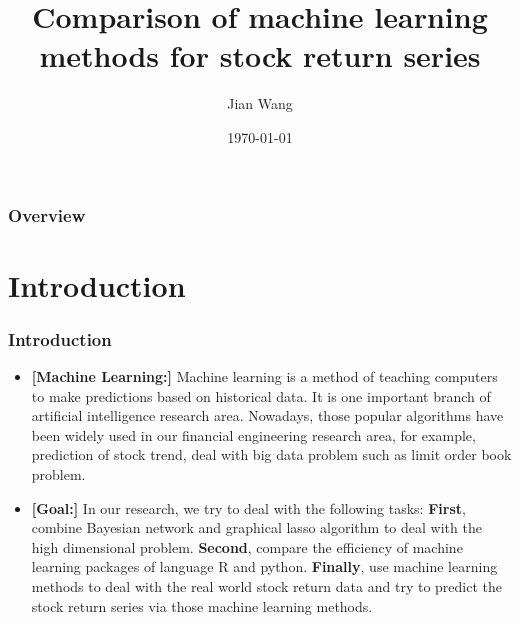 \documentclass{beamer}
\title[Comparison of machine learning methods for stock return series]{Comparison of machine learning methods for stock return series} %
\author{Jian Wang } %
\institute[Florida state university ] %
{Financial math Ph.D. candidate\\
\vspace{3ex}
Florida state university %
\medskip
\textit{jwang@math.fsu.edu} %
}
\date{\today} %
\begin{document}
\begin{frame}
\titlepage %
\end{frame}

\begin{frame}
\frametitle{Overview} %
\tableofcontents %
\end{frame}


\section{Introduction} %


\begin{frame}
\frametitle{Introduction}
\begin{itemize}
\item \textbf{[Machine Learning:]} Machine learning is a method of teaching computers to make predictions based on historical data.  It is one important branch of artificial intelligence research area. Nowadays, those popular algorithms have been widely used in our financial engineering research area, for example, prediction of stock trend,  deal with big data problem such as limit order book problem.
\item \textbf{[Goal:]} In our research, we try to deal with the following tasks: \textbf{First}, combine Bayesian network and graphical lasso algorithm to deal with the high dimensional problem. \textbf{Second}, compare the efficiency of machine learning packages of language R and python. \textbf{Finally}, use machine learning methods to deal with the real world stock return data and try to predict the stock return series via those machine learning methods.  \\
\end{itemize}


\end{frame}
\end{document}
